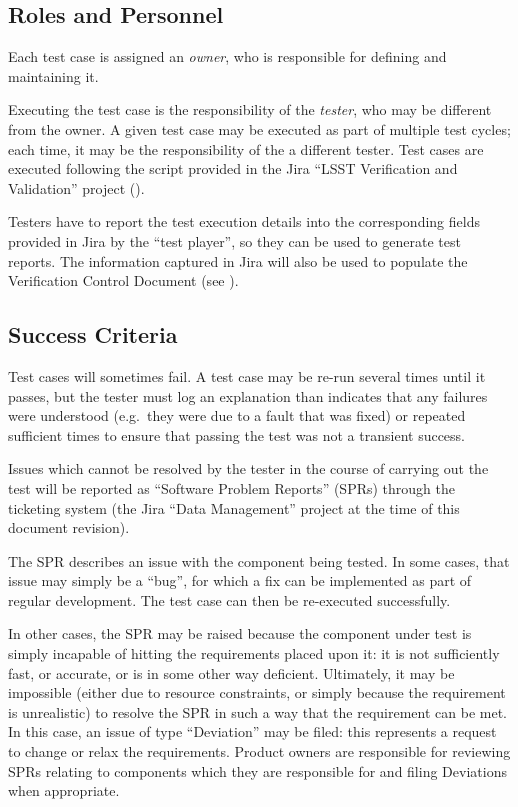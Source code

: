 

\subsection{Roles and Personnel}
\label{sect:roles}

Each test case is assigned an \emph{owner}, who is responsible for defining and maintaining it.

Executing the test case is the responsibility of the \emph{tester}, who may be different from the owner.
A given test case may be executed as part of multiple test cycles; each time, it may be the responsibility of the a different tester.
Test cases are executed following the script provided in the Jira ``LSST Verification and Validation'' project ().

Testers have to report the test execution details into the corresponding fields provided in Jira by the ``test player'',  so they can be used to generate test reports.
The information captured in Jira will also be used to populate the Verification Control Document (see ).

\subsection{Success Criteria}

Test cases will sometimes fail.
A test case may be re-run several times until it passes, but the tester must log an explanation than indicates that any failures were understood (e.g.\ they were due to a fault that was fixed) or repeated sufficient times to ensure that passing the test was not a transient success.

Issues which cannot be resolved by the tester in the course of carrying out the test will be reported as ``Software Problem Reports'' (SPRs) through the \product{} ticketing system (the Jira ``Data Management'' project at the time of this document revision).

The SPR describes an issue with the component being tested.
In some cases, that issue may simply be a ``bug'', for which a fix can be implemented as part of regular \product{} development.
The test case can then be re-executed successfully.

In other cases, the SPR may be raised because the component under test is simply incapable of hitting the requirements placed upon it: it is not sufficiently fast, or accurate, or is in some other way deficient.
Ultimately, it may be impossible (either due to resource constraints, or simply because the requirement is unrealistic) to resolve the SPR in such a way that the requirement can be met.
In this case, an issue of type ``Deviation'' may be filed: this represents a request to change or relax the requirements.
Product owners are responsible for reviewing SPRs relating to components which they are responsible for and filing Deviations when appropriate.

